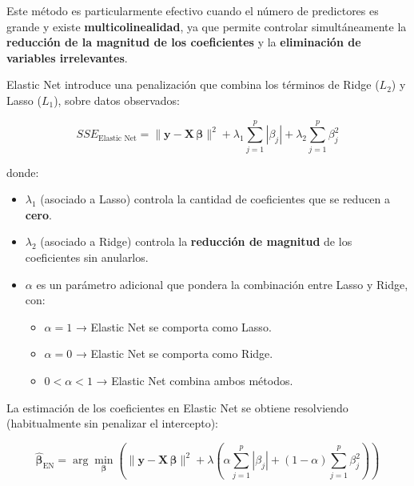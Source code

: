 \documentclass[
  letterpaper,
  DIV=11,
  numbers=noendperiod]{scrreprt}
\providecommand{\tightlist}{%
  \setlength{\itemsep}{0pt}\setlength{\parskip}{0pt}}
\begin{document}
Este método es particularmente efectivo cuando el número de predictores
es grande y existe \textbf{multicolinealidad}, ya que permite controlar
simultáneamente la \textbf{reducción de la magnitud de los coeficientes}
y la \textbf{eliminación de variables irrelevantes}.

Elastic Net introduce una penalización que combina los términos de Ridge
(\(L_2\)) y Lasso (\(L_1\)), sobre datos observados:

\[
SSE_{\text{Elastic Net}} = \| \mathbf{y} - \mathbf{X} \, \boldsymbol{\beta} \|^2 + \lambda_1 \sum_{j=1}^{p} |\beta_j| + \lambda_2 \sum_{j=1}^{p} \beta_j^2 \]

donde:

\begin{itemize}
\tightlist
\item
  \(\lambda_1\) (asociado a Lasso) controla la cantidad de coeficientes
  que se reducen a \textbf{cero}.
\item
  \(\lambda_2\) (asociado a Ridge) controla la \textbf{reducción de
  magnitud} de los coeficientes sin anularlos.
\item
  \(\alpha\) es un parámetro adicional que pondera la combinación entre
  Lasso y Ridge, con:

  \begin{itemize}
  \tightlist
  \item
    \(\alpha = 1\) → Elastic Net se comporta como Lasso.
  \item
    \(\alpha = 0\) → Elastic Net se comporta como Ridge.
  \item
    \(0 < \alpha < 1\) → Elastic Net combina ambos métodos.
  \end{itemize}
\end{itemize}

La estimación de los coeficientes en Elastic Net se obtiene resolviendo
(habitualmente sin penalizar el intercepto):

\[
\hat{\boldsymbol{\beta}}_{\text{EN}} = \arg \min_{\boldsymbol{\beta}} \left( \| \mathbf{y} - \mathbf{X} \, \boldsymbol{\beta} \|^2 + \lambda \left( \alpha \sum_{j=1}^{p} |\beta_j| + (1 - \alpha) \sum_{j=1}^{p} \beta_j^2 \right) \right)
\]
\end{document}
